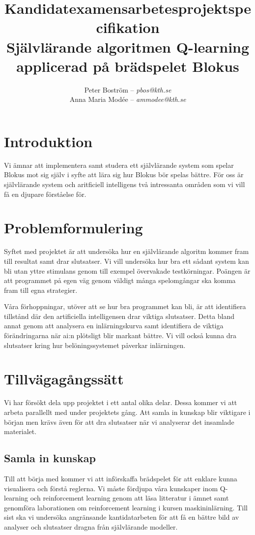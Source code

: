 \documentclass[a4paper,11pt]{article}
\title{Kandidatexamensarbetesprojektspecifikation\\\vspace{4pt}\normalsize Självlärande algoritmen Q-learning applicerad på brädspelet Blokus}
\author{Peter Boström -- \emph{pbos@kth.se}\\Anna Maria Modée -- \emph{ammodee@kth.se}}
\begin{document}
\maketitle
 \pagestyle{fancyplain}

\section*{Introduktion}

Vi ämnar att implementera samt studera ett självlärande system som spelar Blokus mot sig själv i syfte att lära sig hur Blokus bör spelas bättre. För oss är självlärande system och aritficiell intelligens två intressanta områden som vi vill få en djupare förståelse för.

\section*{Problemformulering}

Syftet med projektet är att undersöka hur en självlärande algoritm kommer fram till resultat samt drar slutsatser. Vi vill undersöka hur bra ett sådant system kan bli utan yttre stimulans genom till exempel övervakade testkörningar. Poängen är att programmet på egen väg genom väldigt många spelomgångar ska komma fram till egna strategier.

Våra förhoppningar, utöver att se hur bra programmet kan bli, är att identifiera tillstånd där den artificiella intelligensen drar viktiga slutsatser. Detta bland annat genom att analysera en inlärningskurva samt identifiera de viktiga förändringarna när ai:n plötsligt blir markant bättre. Vi vill också kunna dra slutsatser kring hur belöningssystemet påverkar inlärningen.

\section*{Tillvägagångssätt}

Vi har försökt dela upp projektet i ett antal olika delar. Dessa kommer vi att arbeta parallellt med under projektets gång. Att samla in kunskap blir viktigare i början men krävs även för att dra slutsatser när vi analyserar det insamlade materialet.

\subsection*{Samla in kunskap}

Till att börja med kommer vi att införskaffa brädspelet för att enklare kunna visualisera och förstå reglerna. Vi måste fördjupa våra kunskaper inom Q-learning och reinforcement learning genom att läsa litteratur i ämnet samt genomföra laborationen om reinforcement learning i kursen maskininlärning. Till sist ska vi undersöka angränsande kantidatarbeten för att få en bättre bild av analyser och slutsatser dragna från självlärande modeller.
\end{document}
